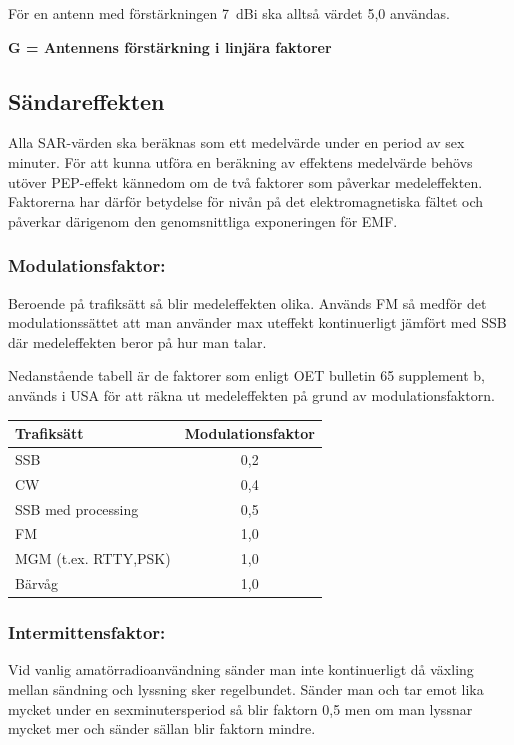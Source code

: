 För en antenn med förstärkningen 7~dBi ska alltså värdet 5,0 användas.

\textbf{G = Antennens förstärkning i linjära faktorer}

\subsection{Sändareffekten}
Alla SAR-värden ska beräknas som ett medelvärde under en period av sex minuter.
För att kunna utföra en beräkning av effektens medelvärde behövs utöver 
PEP-effekt kännedom om de två faktorer som påverkar medeleffekten.
Faktorerna har därför betydelse för nivån på det elektromagnetiska fältet och
påverkar därigenom den genomsnittliga exponeringen för EMF. 

\subsubsection{Modulationsfaktor:}

Beroende på trafiksätt så blir medeleffekten olika.
Används FM så medför det modulationssättet att man använder max uteffekt
kontinuerligt jämfört med SSB där medeleffekten beror på hur man talar.

Nedanstående tabell är de faktorer som enligt OET bulletin 65 supplement b,
\cite{OETbul65b} används i USA för att räkna ut medeleffekten på grund
av modulationsfaktorn.

\begin{tabular}{|l|c|}
	\hline
	Trafiksätt & Modulationsfaktor \\ \hline
	SSB & 0,2 \\ \hline
	CW & 0,4 \\ \hline
	SSB med processing & 0,5 \\ \hline
	FM & 1,0 \\ \hline
	MGM (t.ex. RTTY,PSK) & 1,0 \\ \hline
	Bärvåg & 1,0 \\ \hline
\end{tabular}

\subsubsection{Intermittensfaktor:}

Vid vanlig amatörradioanvändning sänder man inte kontinuerligt då växling
mellan sändning och lyssning sker regelbundet.
Sänder man och tar emot lika mycket under en sexminutersperiod så blir faktorn
0,5 men om man lyssnar mycket mer och sänder sällan blir faktorn mindre.

